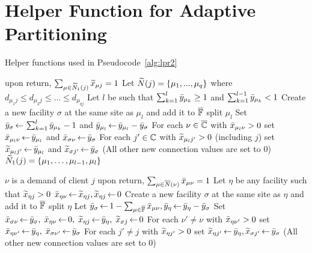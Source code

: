 \documentclass[11pt]{article}
\begin{document}

\section{Helper Function for Adaptive Partitioning}
\begin{algorithm}[ht]
  \caption{Helper functions used in Pseudocode~\ref{alg:lpr2}}
  \label{alg:helper}
  \begin{algorithmic}[1]
						\Comment upon return, $\sum_{\mu\in{\widetilde N}_1(j)} {\widetilde x}_{\mu j} = 1$
    \State Let ${\widetilde N}(j) = \{\mu_1,...,\mu_{q}\}$ where $d_{\mu_1 j} \leq d_{\mu_2 j} \leq \ldots \leq d_{\mu_{q j}}$
    \State Let $l$ be such that $\sum_{k=1}^{l} {\bar y}_{\mu_k} \geq 1$ and $\sum_{k=1}^{l -1} {\bar y}_{\mu_{k}} < 1$
    \State Create a new facility $\sigma$ at the same site as $\mu_l$ and add it to $\overline{\mathbb{F}}$
			\Comment split $\mu_l$
    \State Set ${\bar y}_{\sigma}{\,\leftarrow\,} \sum_{k=1}^{l} {\bar y}_{\mu_{k}}-1$
					and ${\bar y}_{\mu_l} {\,\leftarrow\,} {\bar y}_{\mu_l} - {\bar y}_{\sigma}$
    \State For each $\nu\in\overline{\mathbb{C}}$ with ${\bar x}_{\mu_{l}\nu}>0$
 			set ${\bar x}_{\mu_{l}\nu} {\,\leftarrow\,} {\bar y}_{\mu_l}$ and ${\bar x}_{\sigma \nu} {\,\leftarrow\,} {\bar y}_{\sigma}$
    \State For each $j'\in\mathbb{C}$ with ${\widetilde x}_{\mu_{l} j'}>0$ (including $j$)
			set ${\widetilde x}_{\mu_l j'} {\,\leftarrow\,} {\bar y}_{\mu_l}$ and ${\widetilde x}_{\sigma j'} {\,\leftarrow\,} {\bar y}_\sigma$
	\State (All other new connection values are set to $0$)
    \State \Return ${\widetilde N}_1(j) = \{\mu_{1},\ldots,\mu_{l-1}, \mu_{l}\}$    				
    \EndFunction

    					\Comment $\nu$ is a demand of client $j$
    					\Comment upon return, $\sum_{\mu\in{\overline{N}}(\nu)} {\bar x}_{\mu\nu} = 1$
    \State Let $\eta$ be any facility such that ${\widetilde x}_{\eta j} > 0$
    \State ${\bar x}_{\eta\nu} {\,\leftarrow\,} {\widetilde x}_{\eta j}, {\widetilde x}_{\eta j} {\,\leftarrow\,} 0$
    \Else
    \State Create a new facility $\sigma$ at the same site as $\eta$ and add it to $\overline{\mathbb{F}}$
    					\Comment split $\eta$
    \State Let ${\bar y}_\sigma {\,\leftarrow\,} 1-\sum_{\mu\in \overline{\mathbb{F}}} {\bar x}_{\mu\nu}, {\bar y}_{\eta} {\,\leftarrow\,} {\bar y}_{\eta} - {\bar y}_{\sigma}$
    \State Set ${\bar x}_{\sigma\nu}{\,\leftarrow\,} {\bar y}_{\sigma},\; {\bar x}_{\eta \nu} {\,\leftarrow\,}  0,\; {\widetilde x}_{\eta j} {\,\leftarrow\,} {\bar y}_{\eta}, \; {\widetilde x}_{\sigma j} {\,\leftarrow\,} 0$
    \State For each $\nu' \neq \nu$ with ${\bar x}_{\eta \nu'}>0$ set ${\bar x}_{\eta \nu'} {\,\leftarrow\,} {\bar y}_{\eta},\; {\bar x}_{\sigma \nu'} {\,\leftarrow\,} {\bar y}_{\sigma}$
    \State For each $j' \neq j$ with ${\widetilde x}_{\eta j'}>0$ set ${\widetilde x}_{\eta j'} {\,\leftarrow\,} {\bar y}_{\eta}, {\widetilde x}_{\sigma j'} {\,\leftarrow\,} {\bar y}_{\sigma}$
	\State  (All other new connection values are set to $0$)
    \EndIf
    \EndWhile
    \EndFunction
  \end{algorithmic}
\end{algorithm}
\end{document}
